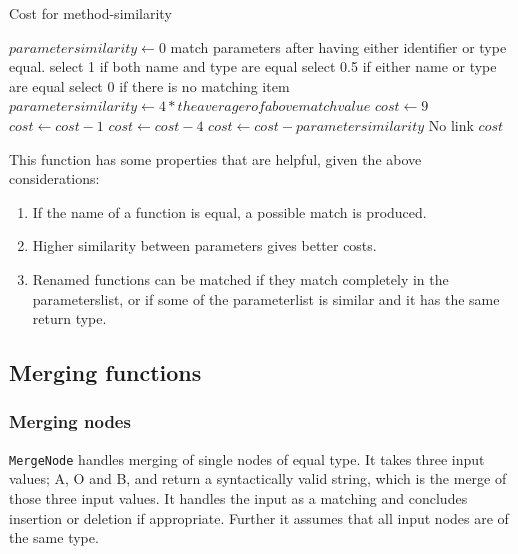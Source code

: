 \documentclass[11pt]{article}
\begin{document}
\begin{algorithm}
\caption{Cost for method-similarity}
\label{MethodCostFunction}
\begin{algorithmic}
   \State $parametersimilarity \gets 0$
      \State match parameters after having either identifier or type equal.
	      \State select 1 if both name and type are equal
    	  \State select 0.5 if either name or type are equal
	      \State select 0 if there is no matching item
      \EndFor
      \State $parametersimilarity \gets 4*the averager of above match value$
   \EndIf
   \State $cost \gets 9$
      \State $cost \gets cost - 1$
   \EndIf
      \State $cost \gets cost - 4$
   \EndIf
   \State $cost \gets cost - parametersimilarity$
         \State \Return No link
   \EndIf
   \State \Return $cost$
\EndFunction
\end{algorithmic}
\end{algorithm}

This function has some properties that are helpful, given the above considerations:

\begin{enumerate}
\item If the name of a function is equal, a possible match is produced.
\item Higher similarity between parameters gives better costs.
\item Renamed functions can be matched if they match completely in the parameterslist, or if some of the parameterlist is similar and it has the same return type.
\end{enumerate}


\subsection{Merging functions}

%

\subsubsection{Merging nodes}
\texttt{MergeNode} handles merging of single nodes of equal type. It takes three input values; A, O and B, and return a syntactically valid string, which is the merge of those three input values. It handles the input as a matching and concludes insertion or deletion if appropriate. Further it assumes that all input nodes are of the same type.
\end{document}
